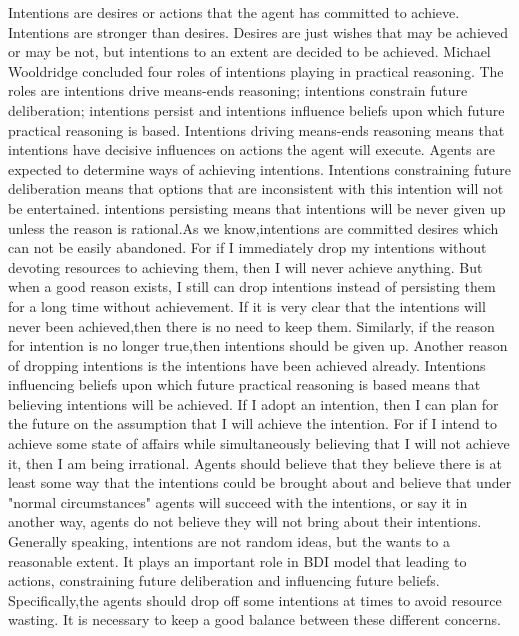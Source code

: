 Intentions are desires or actions that the agent has committed to achieve\cite{Alejandro_LearnBDI_2004}. Intentions are stronger than desires. Desires are just wishes that may be achieved or may be not, but intentions to an extent are decided to be achieved. Michael Wooldridge concluded four roles of intentions playing in practical reasoning. The roles are intentions drive means-ends reasoning; intentions constrain future deliberation; intentions persist and intentions influence beliefs upon which future practical reasoning is based\cite{Gerhard_MultiSystem_1999}. Intentions driving means-ends reasoning means that intentions have decisive influences on actions the agent will execute. Agents are expected to determine ways of achieving intentions. Intentions constraining future deliberation means that options that are inconsistent with this intention will not be entertained. intentions persisting means that intentions will be never given up unless the reason is rational.As we know,intentions are committed desires which can not be easily abandoned. For if I immediately drop my intentions without devoting resources to achieving them, then I will never achieve anything\cite{Gerhard_MultiSystem_1999}. But when a good reason exists, I still can drop intentions instead of persisting them for a long time without achievement. If it is very clear that the intentions will never been achieved,then there is no need to keep them. Similarly, if the reason for intention is no longer true,then intentions should be given up. Another reason of dropping intentions is the intentions have been achieved already. Intentions influencing beliefs upon which future practical reasoning is based means that believing intentions will be achieved. If I adopt an intention, then I can plan for the future on the assumption that I will achieve the intention. For if I intend to achieve some state of affairs while simultaneously believing that I will not achieve it, then I am being irrational\cite{Gerhard_MultiSystem_1999}. Agents should believe that they believe there is at least some way that the intentions could be brought about and believe that under "normal circumstances" agents will succeed with the intentions, or say it in another way, agents do not believe they will not bring about their intentions. Generally speaking, intentions are not random ideas, but the wants to a reasonable extent. It plays an important role in BDI model that leading to actions, constraining future deliberation and influencing future beliefs. Specifically,the agents should drop off some intentions at times to avoid resource wasting. It is necessary to keep a good balance between these different concerns.

